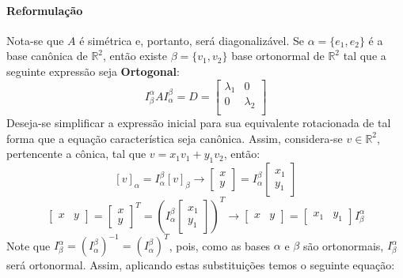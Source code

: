 \documentclass{article}
\begin{document}
            \paragraph{Reformulação}Nota-se que $A$ é simétrica e, portanto, será diagonalizável. Se $\alpha = \{e_{1}, e_{2}\}$ é a base canônica de $\mathbb{R}^{2}$, então existe $\beta = \{v_{1}, v_{2}\}$ base ortonormal de $\mathbb{R}^{2}$ tal que a seguinte expressão seja \textbf{Ortogonal}:
                \[
                    I^{\alpha}_{\beta} A I^{\beta}_{\alpha} = D = \begin{bmatrix} \lambda_{1} & 0\\ 0 & \lambda_{2}\\ \end{bmatrix}
                \]
            Deseja-se simplificar a expressão inicial para sua equivalente rotacionada de tal forma que a equação característica seja canônica. Assim, considera-se $v\in\mathbb{R}^{2}$, pertencente a cônica, tal que $v = x_{1} v_{1} + y_{1} v_{2}$, então:
                \[
                    [v]_{\alpha}
                    = I_{\alpha}^{\beta} [v]_{\beta}
                    \rightarrow
                    \boxed{
                        \begin{bmatrix}x \\ y\end{bmatrix}
                        = I_{\alpha}^{\beta} \begin{bmatrix}x_{1} \\ y_{1}\end{bmatrix}
                    }
                \]
                \[
                    \begin{bmatrix}x & y\end{bmatrix}
                    = \begin{bmatrix}x \\ y\end{bmatrix}^T
                    = \left(I_{\alpha}^{\beta}\begin{bmatrix}x_{1} \\ y_{1}\end{bmatrix}\right)^T
                    \rightarrow
                    \boxed{
                        \begin{bmatrix}x & y\end{bmatrix}
                        = \begin{bmatrix}x_{1} & y_{1}\end{bmatrix} I_{\beta}^{\alpha}
                    }
                \]
            Note que $I_{\beta}^{\alpha} = (I_{\alpha}^{\beta})^{-1} = (I_{\alpha}^{\beta})^{T}$, pois, como as bases $\alpha$ e $\beta$ são ortonormais, $I_{\beta}^{\alpha}$ será ortonormal. Assim, aplicando estas substituições temos o seguinte equação:
\end{document}
